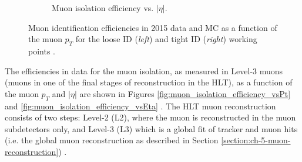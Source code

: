 \begin{figure}[h]
\begin{subfigure}{0.45\textwidth}
        \caption{Muon isolation efficiency vs. $|\eta|$.}
        \label{fig:muon_tightID_efficiency}
    \end{subfigure}
    \caption[Muon identification efficiencies in 2015 data and MC as a function of the muon $p_{T}$ for the loose ID (\textit{left}) and tight ID (\textit{right}) working points.]{Muon identification efficiencies in 2015 data and MC as a function of the muon $p_{T}$ for the loose ID (\textit{left}) and tight ID (\textit{right}) working points \cite{CMS-MUO-16-001}.} 
\end{figure}

The efficiencies in data for the muon isolation, as measured in Level-3 muons (muons in one of the final stages of reconstruction in the HLT), as a function of the muon $p_{T}$ and $|\eta|$ are shown in Figures \ref{fig:muon_isolation_efficiency_vsPt} and \ref{fig:muon_isolation_efficiency_vsEta} \cite{CMS-MUO-16-001}. The HLT muon reconstruction consists of two steps: Level-2 (L2), where the muon is reconstructed in the muon subdetectors only, and Level-3 (L3) which is a global fit of tracker and muon hits (i.e. the global muon reconstruction as described in Section \ref{section:ch-5-muon-reconstruction}) \cite{Verwilligen-proceedings-2016}.

